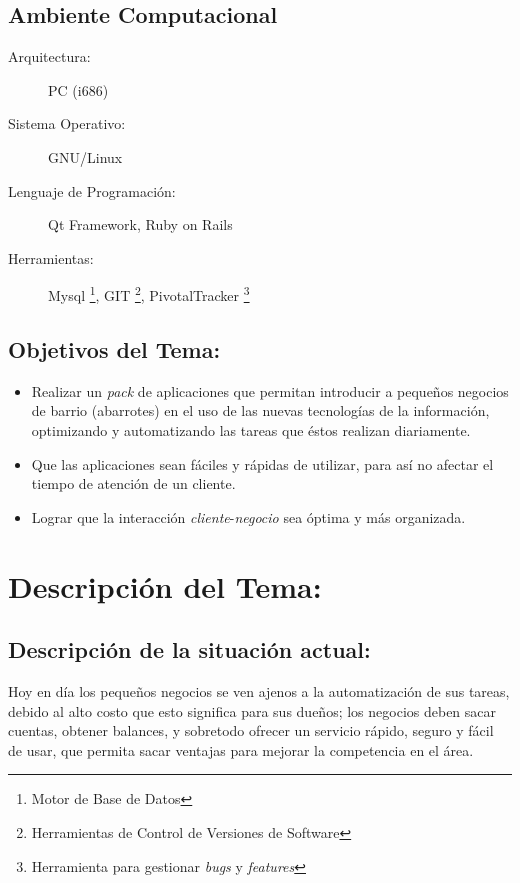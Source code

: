\documentclass[a4paper,12pt]{article}
\begin{document}
\subsection{Ambiente Computacional}
  \begin{description}
   \item [Arquitectura:] PC (i686)
   \item [Sistema Operativo:] GNU/Linux
   \item [Lenguaje de Programación: ] Qt Framework, Ruby on Rails
   \item [Herramientas: ] Mysql \footnote{Motor de Base de Datos}, GIT \footnote{Herramientas de Control de 
    Versiones de Software}, PivotalTracker \footnote{Herramienta para gestionar \emph{bugs} y \emph{features}}
  \end{description}

\subsection{Objetivos del Tema:}
  \begin{itemize}
   \item Realizar un \emph{pack} de aplicaciones que permitan introducir a pequeños negocios de barrio (abarrotes) en el 
         uso de las nuevas tecnologías de la información, optimizando y automatizando las tareas que éstos realizan diariamente.

   \item Que las aplicaciones sean fáciles y rápidas de utilizar, para así no afectar el tiempo de atención de un cliente.

   \item Lograr que la interacción \emph{cliente}-\emph{negocio} sea óptima y más organizada.
  \end{itemize}

\pagebreak

\section{Descripción del Tema:}
\subsection{Descripción de la situación actual:} %
    Hoy en día los pequeños negocios se ven ajenos a la automatización de sus tareas, debido al alto costo 
  que esto significa para sus dueños; los negocios deben sacar cuentas, obtener balances, y sobretodo ofrecer 
  un servicio rápido, seguro y fácil de usar, que permita sacar ventajas para mejorar la competencia en el área.
\end{document}
